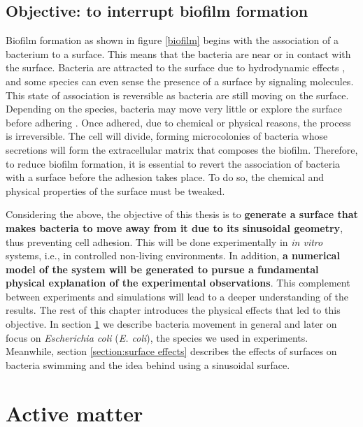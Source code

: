 \subsection{Objective: to interrupt biofilm formation}

Biofilm formation as shown in figure \ref{biofilm} begins with the association of a bacterium to a surface. This means that the bacteria are near or in contact with the surface. Bacteria are attracted to the surface due to hydrodynamic effects \cite{Berke2008HydrodynamicSurfaces}, and some species can even sense the presence of a surface by signaling molecules. This state of association is reversible as bacteria are still moving on the surface. Depending on the species, bacteria may move very little or explore the surface before adhering \cite{Costerton1999IntroductionBiofilm}. Once adhered, due to chemical or physical reasons, the process is irreversible. The cell will divide, forming microcolonies of bacteria whose secretions will form the extracellular matrix that composes the biofilm. Therefore, to reduce biofilm formation, it is essential to revert the association of bacteria with a surface before the adhesion takes place. To do so, the chemical and physical properties of the surface must be tweaked.

Considering the above, the objective of this thesis is to \textbf{generate a surface that makes bacteria to move away from it due to its sinusoidal geometry}, thus preventing cell adhesion. This will be done experimentally in \textit{in vitro} systems, i.e., in controlled non-living environments. In addition, \textbf{a numerical model of the system will be generated to pursue a fundamental physical explanation of the experimental observations}. This complement between experiments and simulations will lead to a deeper understanding of the results. The rest of this chapter introduces the physical effects that led to this objective. In section \ref{section:active matter} we describe bacteria movement in general and later on focus on \textit{Escherichia coli} (\textit{E. coli}), the species we used in experiments. Meanwhile, section \ref{section:surface effects} describes the effects of surfaces on bacteria swimming and the idea behind using a sinusoidal surface.

\section{Active matter}
\label{section:active matter}

